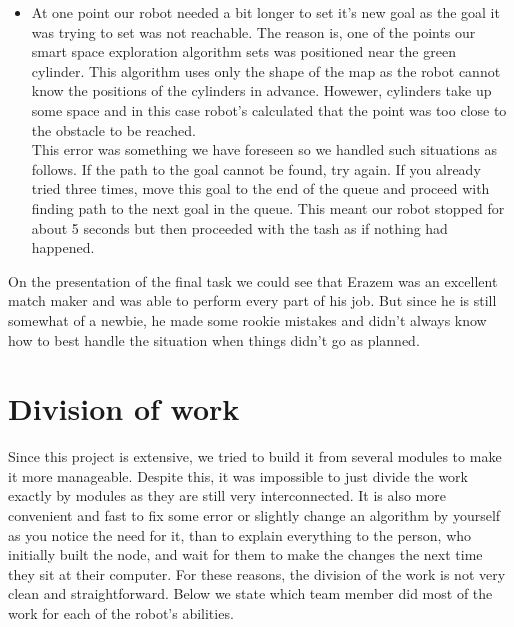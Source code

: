 \documentclass[12pt,a4paper]{article}
\begin{document}
\begin{itemize}
		\item At one point our robot needed a bit longer to set it's new goal as the goal it was trying to set was not reachable. The reason is, one of the points our smart space exploration algorithm sets was positioned near the green cylinder. This algorithm uses only the shape of the map as the robot cannot know the positions of the cylinders in advance. Howewer, cylinders take up some space and in this case robot's calculated that the point was too close to the obstacle to be reached. \\
		This error was something we have foreseen so we handled such situations as follows. If the path to the goal cannot be found, try again. If you already tried three times, move this goal to the end of the queue and proceed with finding path to the next goal in the queue. This meant our robot stopped for about 5 seconds but then proceeded with the tash as if nothing had happened.
	\end{itemize}


	On the presentation of the final task we could see that Erazem was an excellent match maker and was able to perform every part of his job. But since he is still somewhat of a newbie, he made some rookie mistakes and didn't always know how to best handle the situation when things didn't go as planned.

	\section{Division of work}
	Since this project is extensive, we tried to build it from several modules to make it more manageable. Despite this, it was impossible to just divide the work exactly by modules as they are still very interconnected. It is also more convenient and fast to fix some error or slightly change an algorithm by yourself as you notice the need for it, than to explain everything to the person, who initially built the node, and wait for them to make the changes the next time they sit at their computer. For these reasons, the division of the work is not very clean and straightforward. Below we state which team member did most of the work for each of the robot's abilities. \\
\end{document}
